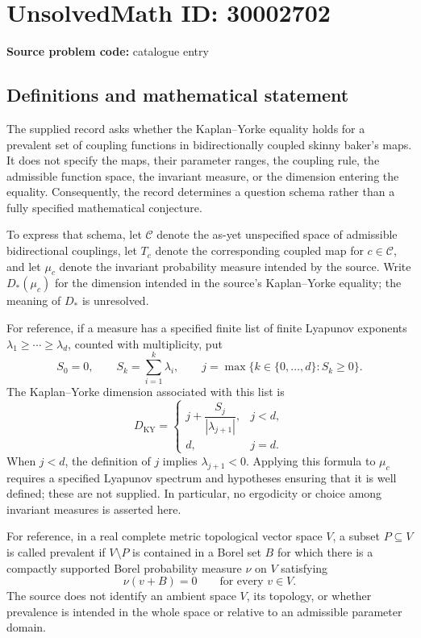 \documentclass[11pt]{article}
\begin{document}
\section*{UnsolvedMath ID: 30002702}
\textbf{Source problem code:} catalogue entry
\subsection{Definitions and mathematical statement}
The supplied record asks whether the Kaplan--Yorke equality holds for a prevalent set of coupling functions in bidirectionally coupled skinny baker's maps. It does not specify the maps, their parameter ranges, the coupling rule, the admissible function space, the invariant measure, or the dimension entering the equality. Consequently, the record determines a question schema rather than a fully specified mathematical conjecture.

To express that schema, let \(\mathcal C\) denote the as-yet unspecified space of admissible bidirectional couplings, let \(T_c\) denote the corresponding coupled map for \(c\in\mathcal C\), and let \(\mu_c\) denote the invariant probability measure intended by the source. Write \(D_*(\mu_c)\) for the dimension intended in the source's Kaplan--Yorke equality; the meaning of \(D_*\) is unresolved.

For reference, if a measure has a specified finite list of finite Lyapunov exponents \(\lambda_1\geq\cdots\geq\lambda_d\), counted with multiplicity, put
\[
S_0=0,\qquad S_k=\sum_{i=1}^{k}\lambda_i,\qquad
j=\max\{k\in\{0,\ldots,d\}:S_k\geq0\}.
\]
The Kaplan--Yorke dimension associated with this list is
\[
D_{\mathrm{KY}}=
\begin{cases}
j+\dfrac{S_j}{|\lambda_{j+1}|},&j<d,\\
d,&j=d.
\end{cases}
\]
When \(j<d\), the definition of \(j\) implies \(\lambda_{j+1}<0\). Applying this formula to \(\mu_c\) requires a specified Lyapunov spectrum and hypotheses ensuring that it is well defined; these are not supplied. In particular, no ergodicity or choice among invariant measures is asserted here.

For reference, in a real complete metric topological vector space \(V\), a subset \(P\subseteq V\) is called prevalent if \(V\setminus P\) is contained in a Borel set \(B\) for which there is a compactly supported Borel probability measure \(\nu\) on \(V\) satisfying
\[
\nu(v+B)=0\qquad\text{for every }v\in V.
\]
The source does not identify an ambient space \(V\), its topology, or whether prevalence is intended in the whole space or relative to an admissible parameter domain.
\end{document}

